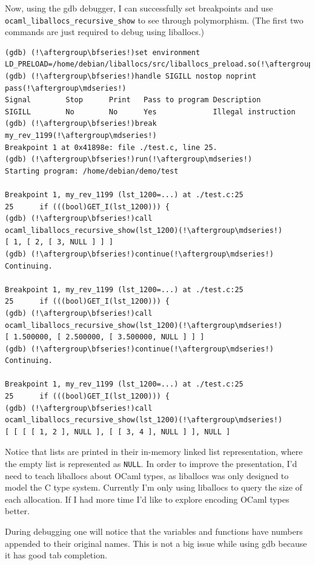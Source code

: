 \documentclass[12pt,a4paper,twoside,openright]{report}
\begin{document}
Now, using the gdb debugger, I can successfully set breakpoints and use
\lstinline!ocaml_liballocs_recursive_show! to see through polymorphism. (The
first two commands are just required to debug using liballocs.)

\begin{lstlisting}
(gdb) (!\aftergroup\bfseries!)set environment LD_PRELOAD=/home/debian/liballocs/src/liballocs_preload.so(!\aftergroup\mdseries!)
(gdb) (!\aftergroup\bfseries!)handle SIGILL nostop noprint pass(!\aftergroup\mdseries!)
Signal        Stop      Print   Pass to program Description
SIGILL        No        No      Yes             Illegal instruction
(gdb) (!\aftergroup\bfseries!)break my_rev_1199(!\aftergroup\mdseries!)
Breakpoint 1 at 0x41898e: file ./test.c, line 25.
(gdb) (!\aftergroup\bfseries!)run(!\aftergroup\mdseries!)
Starting program: /home/debian/demo/test

Breakpoint 1, my_rev_1199 (lst_1200=...) at ./test.c:25
25      if (((bool)GET_I(lst_1200))) {
(gdb) (!\aftergroup\bfseries!)call ocaml_liballocs_recursive_show(lst_1200)(!\aftergroup\mdseries!)
[ 1, [ 2, [ 3, NULL ] ] ]
(gdb) (!\aftergroup\bfseries!)continue(!\aftergroup\mdseries!)
Continuing.

Breakpoint 1, my_rev_1199 (lst_1200=...) at ./test.c:25
25      if (((bool)GET_I(lst_1200))) {
(gdb) (!\aftergroup\bfseries!)call ocaml_liballocs_recursive_show(lst_1200)(!\aftergroup\mdseries!)
[ 1.500000, [ 2.500000, [ 3.500000, NULL ] ] ]
(gdb) (!\aftergroup\bfseries!)continue(!\aftergroup\mdseries!)
Continuing.

Breakpoint 1, my_rev_1199 (lst_1200=...) at ./test.c:25
25      if (((bool)GET_I(lst_1200))) {
(gdb) (!\aftergroup\bfseries!)call ocaml_liballocs_recursive_show(lst_1200)(!\aftergroup\mdseries!)
[ [ [ [ 1, 2 ], NULL ], [ [ 3, 4 ], NULL ] ], NULL ]
\end{lstlisting}

Notice that lists are printed in their in-memory linked list representation,
where the empty list is represented as \lstinline!NULL!. In order to improve the
presentation, I'd need to teach liballocs about OCaml types, as liballocs was
only designed to model the C type system. Currently I'm only
using liballocs to query the size of each allocation. If I had more time I'd like
to explore encoding OCaml types better.

During debugging one will notice that the variables and functions have numbers
appended to their original names. This is not a big issue while using gdb
because it has good tab completion.
\end{document}
